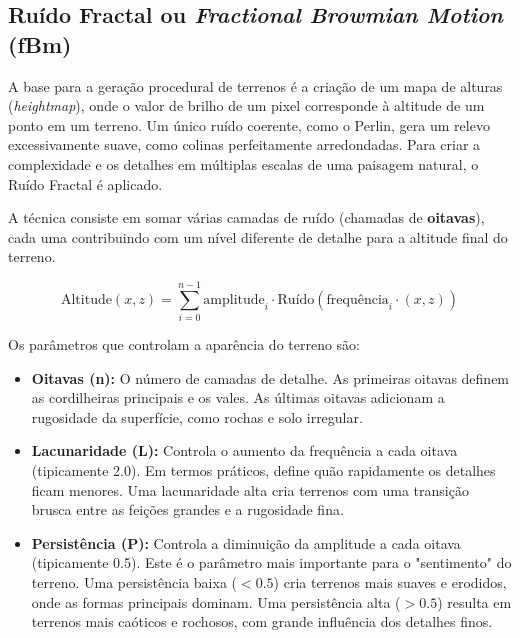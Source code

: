 \subsection{Ruído Fractal ou \textit{Fractional Browmian Motion} (fBm)}

A base para a geração procedural de terrenos é a criação de um mapa de alturas (\textit{heightmap}), onde o valor de brilho de um pixel corresponde à altitude de um ponto em um terreno. Um único ruído coerente, como o Perlin, gera um relevo excessivamente suave, como colinas perfeitamente arredondadas. Para criar a complexidade e os detalhes em múltiplas escalas de uma paisagem natural, o Ruído Fractal é aplicado.

A técnica consiste em somar várias camadas de ruído (chamadas de \textbf{oitavas}), cada uma contribuindo com um nível diferente de detalhe para a altitude final do terreno.

\begin{equation*}
\text{Altitude}(x, z) = \sum_{i=0}^{n-1} \text{amplitude}_i \cdot \text{Ruído}(\text{frequência}_i \cdot (x, z))
\end{equation*}

Os parâmetros que controlam a aparência do terreno são:
\begin{itemize}
\item \textbf{Oitavas (n):} O número de camadas de detalhe. As primeiras oitavas definem as cordilheiras principais e os vales. As últimas oitavas adicionam a rugosidade da superfície, como rochas e solo irregular.
\item \textbf{Lacunaridade (L):} Controla o aumento da frequência a cada oitava (tipicamente 2.0). Em termos práticos, define quão rapidamente os detalhes ficam menores. Uma lacunaridade alta cria terrenos com uma transição brusca entre as feições grandes e a rugosidade fina.

\item \textbf{Persistência (P):} Controla a diminuição da amplitude a cada oitava (tipicamente 0.5). Este é o parâmetro mais importante para o "sentimento" do terreno. Uma persistência baixa ($<0.5$) cria terrenos mais suaves e erodidos, onde as formas principais dominam. Uma persistência alta ($>0.5$) resulta em terrenos mais caóticos e rochosos, com grande influência dos detalhes finos.

\end{itemize}

